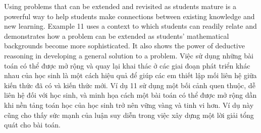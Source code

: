\documentclass[
  10pt,
  a4paper,
  landscape,
  twoside,
  openany
]{scrbook}
\newcommand{\EN}[1]{#1}
\newcommand{\VI}[1]{#1}
\newcommand{\NOTE}[1]{#1}
\begin{document}
\TriPara
{
\EN{Using problems that can be extended and revisited as students mature is a powerful way to help students make connections between existing knowledge and new learning. Example 11 uses a context to which students can readily relate and demonstrates how a problem can be extended as students' mathematical backgrounds become more sophisticated. It also shows the power of deductive reasoning in developing a general solution to a problem.}
}
{
\VI{Việc sử dụng những bài toán có thể được mở rộng và quay lại khai thác ở các giai đoạn phát triển khác nhau của học sinh là một cách hiệu quả để giúp các em thiết lập mối liên hệ giữa kiến thức đã có và kiến thức mới. Ví dụ 11 sử dụng một bối cảnh quen thuộc, dễ liên hệ đối với học sinh, và minh họa cách một bài toán có thể được mở rộng dần khi nền tảng toán học của học sinh trở nên vững vàng và tinh vi hơn. Ví dụ này cũng cho thấy sức mạnh của luận suy diễn trong việc xây dựng một lời giải tổng quát cho bài toán.}
}
{
\NOTE{}
}

\end{document}
